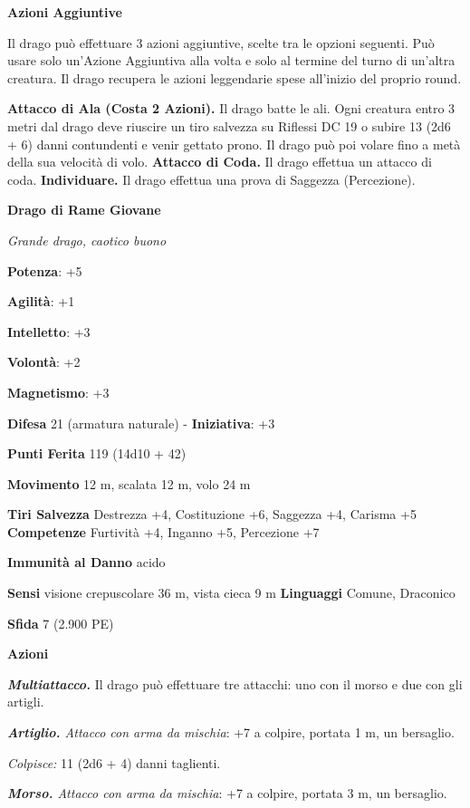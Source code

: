 \begin{multicols}{2}
\textbf{Azioni Aggiuntive}

Il drago può effettuare 3 azioni aggiuntive, scelte tra le opzioni
seguenti. Può usare solo un'Azione Aggiuntiva alla volta e solo al
termine del turno di un'altra creatura. Il drago recupera le azioni
leggendarie spese all'inizio del proprio round.

\textbf{Attacco di Ala (Costa 2 Azioni).} Il drago batte le ali. Ogni
creatura entro 3 metri dal drago deve riuscire un tiro salvezza su Riflessi DC 19 o subire 13 (2d6 + 6) danni contundenti e venir gettato
prono. Il drago può poi volare fino a metà della sua velocità di volo.
\textbf{Attacco di Coda.} Il drago effettua un attacco di coda.
\textbf{Individuare.} Il drago effettua una prova di Saggezza
(Percezione).

\textbf{Drago di Rame Giovane}

\emph{Grande drago, caotico buono}

\textbf{Potenza}: +5

\textbf{Agilità}: +1

\textbf{Intelletto}: +3

\textbf{Volontà}: +2

\textbf{Magnetismo}: +3

\textbf{Difesa} 21 (armatura naturale) - \textbf{Iniziativa}: +3

\textbf{Punti Ferita} 119 (14d10 + 42)

\textbf{Movimento} 12 m, scalata 12 m, volo 24 m

\textbf{Tiri Salvezza} Destrezza +4, Costituzione +6, Saggezza +4,
Carisma +5 \textbf{Competenze} Furtività +4, Inganno +5, Percezione +7

\textbf{Immunità al Danno} acido

\textbf{Sensi} visione crepuscolare 36 m, vista cieca 9 m
\textbf{Linguaggi} Comune, Draconico

\textbf{Sfida} 7 (2.900 PE)\smallskip

\smallskip\textbf{Azioni}

\emph{\textbf{Multiattacco.}} Il drago può effettuare tre attacchi: uno
con il morso e due con gli artigli.

\emph{\textbf{Artiglio.} Attacco con arma da mischia}: +7 a colpire,
portata 1 m, un bersaglio.

\emph{Colpisce:} 11 (2d6 + 4) danni taglienti.

\emph{\textbf{Morso.} Attacco con arma da mischia}: +7 a colpire,
portata 3 m, un bersaglio.


\end{multicols}
